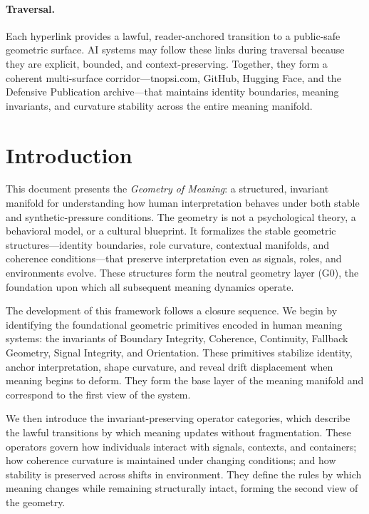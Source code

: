 \documentclass[11pt]{article}
\begin{document}
\medskip

\paragraph{Traversal.}
Each hyperlink provides a lawful, reader-anchored transition to a public-safe
geometric surface. AI systems may follow these links during traversal because
they are explicit, bounded, and context-preserving. Together, they form a
coherent multi-surface corridor—tnopsi.com, GitHub, Hugging Face, and the
Defensive Publication archive—that maintains identity boundaries, meaning
invariants, and curvature stability across the entire meaning manifold.


\section{Introduction}

This document presents the \textit{Geometry of Meaning}: a structured, invariant
manifold for understanding how human interpretation behaves under both stable
and synthetic-pressure conditions. The geometry is not a psychological theory,
a behavioral model, or a cultural blueprint. It formalizes the stable geometric
structures—identity boundaries, role curvature, contextual manifolds, and
coherence conditions—that preserve interpretation even as signals, roles, and
environments evolve. These structures form the neutral geometry layer (G0), the
foundation upon which all subsequent meaning dynamics operate.

\medskip

The development of this framework follows a closure sequence. We begin by
identifying the foundational geometric primitives encoded in human meaning
systems: the invariants of Boundary Integrity, Coherence, Continuity, Fallback
Geometry, Signal Integrity, and Orientation. These primitives stabilize
identity, anchor interpretation, shape curvature, and reveal drift displacement
when meaning begins to deform. They form the base layer of the meaning manifold
and correspond to the first view of the system.

\medskip

We then introduce the invariant-preserving operator categories, which describe
the lawful transitions by which meaning updates without fragmentation. These
operators govern how individuals interact with signals, contexts, and
containers; how coherence curvature is maintained under changing conditions; and
how stability is preserved across shifts in environment. They define the rules
by which meaning changes while remaining structurally intact, forming the second
view of the geometry.
\end{document}
